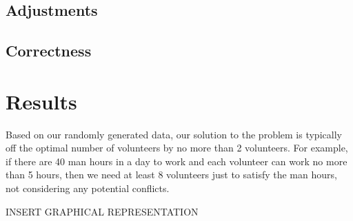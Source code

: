 \documentclass[11pt]{article}
\newif\ifcomment
\newcommand{\comment}[1]{\ifcomment#1\fi}
\theoremstyle{definition}
\begin{document}
\begin{multicols}{2}
\subsection{Adjustments}

\comment{
Our program takes the following as input from the event organizers:
\begin{itemize}
\item A list of volunteers each with their preferences and the jobs they can do.
\item A list of jobs and the shifts for the jobs.
\item The maximum number of hours a volunteer can work in a day.
\item The maximum and minimum number of hours a volunteer can work total for the event
\end{itemize}
However, in script form, we allowed these inputs to be hardcoded in as constants.
Savoy Swing Club does not have any upcoming events until September of this year so the priority is getting a good algorithm that makes favorable schedules.

Given a large pool of potential volunteers, we randomly pick sufficiently sized subsets of the volunteers and try to match them.
One would think that this probably doesn't give a very good result but it turns out, based on the very lowest possible bound of the number of volunteers required to run the event, our algorithm usually finds an schedules with a factor of 2 volunteers.

We encode the problem of volunteers having external time conflicts by pre-filling each volunteer's schedule with ``jobs'' that are labeled ``UNAVAILABLE''.
} %
\subsection{Correctness}

\section{Results}
Based on our randomly generated data, our solution to the problem is typically off the optimal number of volunteers by no more than 2 volunteers.
For example, if there are 40 man hours in a day to work and each volunteer can work no more than 5 hours, then we need at least 8 volunteers just to satisfy the man hours, not considering any potential conflicts.

INSERT GRAPHICAL REPRESENTATION


\end{multicols}
\end{document}
